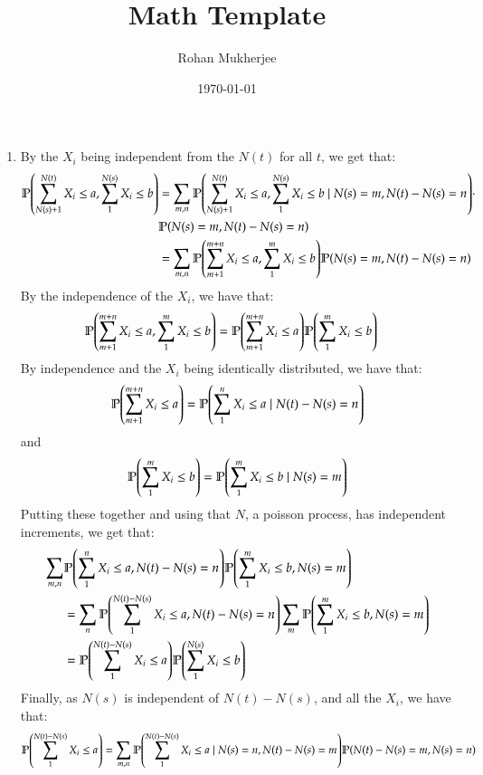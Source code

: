 \documentclass[12pt]{article}
\title{Math Template}
\date{\today}
\author{Rohan Mukherjee}
\theoremstyle{definitionstyle}
\newcommand{\1}{\mathds 1}
\renewcommand{\P}{\mathbb P \qty}
\begin{document}
    \maketitle
    \begin{enumerate}
        \item By the $X_i$ being independent from the $N(t)$ for all $t$, we get that:
        \begin{align*}
            \P(\sum_{N(s)+1}^{N(t)} X_i \leq a, \sum_{1}^{N(s)} X_i \leq b) &= \sum_{m,n} \P(\sum_{N(s)+1}^{N(t)} X_i \leq a, \sum_{1}^{N(s)} X_i \leq b \mid N(s) = m, N(t) - N(s) = n) \cdot \\ 
            &\P(N(s) = m, N(t) - N(s) = n) \\
            &= \sum_{m,n} \P(\sum_{m+1}^{m+n} X_i \leq a, \sum_{1}^{m} X_i \leq b) \P(N(s) = m, N(t) - N(s) = n) \\
        \end{align*}
        By the independence of the $X_i$, we have that:
        \begin{align*}
            \P(\sum_{m+1}^{m+n} X_i \leq a, \sum_{1}^{m} X_i \leq b) &= \P(\sum_{m+1}^{m+n} X_i \leq a) \P(\sum_{1}^{m} X_i \leq b)
        \end{align*}
        By independence and the $X_i$ being identically distributed, we have that:
        \begin{align*}
            \P(\sum_{m+1}^{m+n} X_i \leq a) = \P(\sum_{1}^{n} X_i \leq a \mid N(t) - N(s) = n)
        \end{align*} and 
        \begin{align*}
            \P(\sum_{1}^{m} X_i \leq b) = \P(\sum_{1}^{m} X_i \leq b \mid N(s) = m)
        \end{align*} 
        Putting these together and using that $N$, a poisson process, has independent increments, we get that:
        \begin{align*}
            \sum_{m,n} &\P(\sum_1^n X_i \leq a, N(t)-N(s) = n) \P(\sum_1^m X_i \leq b, N(s) = m) \\
            &= \sum_n \P(\sum_1^{N(t)-N(s)} X_i \leq a, N(t)-N(s) = n) \sum_m \P(\sum_1^m X_i \leq b, N(s) = m) \\
            &= \P(\sum_1^{N(t)-N(s)} X_i \leq a) \P(\sum_1^{N(s)} X_i \leq b)
        \end{align*}
        Finally, as $N(s)$ is independent of $N(t)-N(s)$, and all the $X_i$, we have that:
        \begin{align*}
            \P(\sum_1^{N(t)-N(s)} X_i \leq a) = \sum_{m,n} \P(\sum_1^{N(t)-N(s)} X_i \leq a \mid N(s) = n, N(t) - N(s) = m) \P(N(t) - N(s) = m, N(s) = n)

\end{align*}
\end{enumerate}
\end{document}
